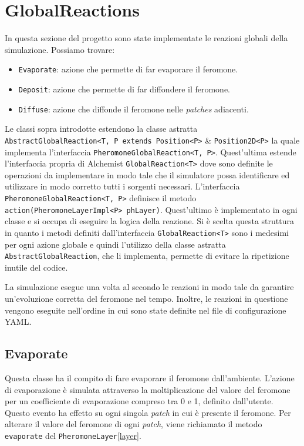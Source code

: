 \section{GlobalReactions}
In questa sezione del progetto sono state implementate le reazioni globali della simulazione. Possiamo trovare:
\begin{itemize}
    \item \texttt{Evaporate}: azione che permette di far evaporare il feromone.
    \item \texttt{Deposit}: azione che permette di far diffondere il feromone.
    \item \texttt{Diffuse}: azione che diffonde il feromone nelle \textit{patches} adiacenti.
\end{itemize}
Le classi sopra introdotte estendono la classe astratta \texttt{AbstractGlobalReaction<T, P extends Position<P>}
\& \texttt{Position2D<P>}
la quale implementa l'interfaccia \newline\texttt{PheromoneGlobalReaction<T, P>}. Quest'ultima estende l'interfaccia 
propria di Alchemist \texttt{GlobalReaction<T>} dove sono definite le operazioni da implementare in modo tale che il 
simulatore possa identificare ed utilizzare in modo corretto tutti i sorgenti necessari.
L'interfaccia \texttt{PheromoneGlobalReaction<T, P>} definisce il metodo \texttt{action(PheromoneLayerImpl<P> phLayer)}.
Quest'ultimo è implementato in ogni classe e si occupa di eseguire la logica della reazione.
Si è scelta questa struttura in quanto i metodi definiti dall'interfaccia \texttt{GlobalReaction<T>}
sono i medesimi per ogni azione globale e quindi l'utilizzo della classe astratta \texttt{AbstractGlobalReaction},
che li implementa, permette di evitare la ripetizione inutile del codice.

La simulazione esegue una volta al secondo le reazioni in modo tale da garantire un'evoluzione corretta del feromone nel tempo. Inoltre, le reazioni
in questione vengono eseguite nell'ordine in cui sono state definite nel file di configurazione YAML\@.
\subsection{Evaporate}
Questa classe ha il compito di fare evaporare il feromone dall'ambiente. L'azione di evaporazione è simulata
attraverso la moltiplicazione del valore del feromone per un coefficiente di evaporazione compreso tra 0 e 1, 
definito dall'utente. Questo evento ha effetto su ogni singola \textit{patch} in cui è presente il feromone.
Per alterare il valore del feromone di ogni \textit{patch}, viene richiamato il metodo 
\texttt{evaporate} del \texttt{PheromoneLayer}\space\ref{layer}.
\newline


